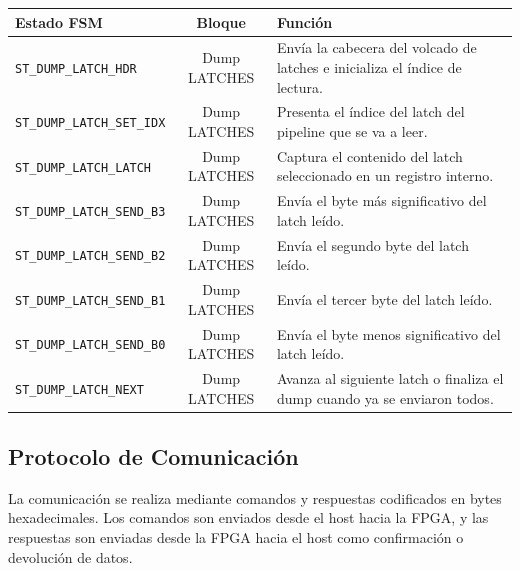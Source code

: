 \begin{center}
\begin{tabular}{|l|c|p{8.3cm}|}
\hline
\textbf{Estado FSM} & \textbf{Bloque} & \textbf{Función} \\ \hline
\texttt{ST\_DUMP\_LATCH\_HDR} & Dump LATCHES & Envía la cabecera del volcado de latches e inicializa el índice de lectura. \\ \hline
\texttt{ST\_DUMP\_LATCH\_SET\_IDX} & Dump LATCHES & Presenta el índice del latch del pipeline que se va a leer. \\ \hline
\texttt{ST\_DUMP\_LATCH\_LATCH} & Dump LATCHES & Captura el contenido del latch seleccionado en un registro interno. \\ \hline
\texttt{ST\_DUMP\_LATCH\_SEND\_B3} & Dump LATCHES & Envía el byte más significativo del latch leído. \\ \hline
\texttt{ST\_DUMP\_LATCH\_SEND\_B2} & Dump LATCHES & Envía el segundo byte del latch leído. \\ \hline
\texttt{ST\_DUMP\_LATCH\_SEND\_B1} & Dump LATCHES & Envía el tercer byte del latch leído. \\ \hline
\texttt{ST\_DUMP\_LATCH\_SEND\_B0} & Dump LATCHES & Envía el byte menos significativo del latch leído. \\ \hline
\texttt{ST\_DUMP\_LATCH\_NEXT} & Dump LATCHES & Avanza al siguiente latch o finaliza el dump cuando ya se enviaron todos. \\ \hline
\end{tabular}
\end{center}

\subsection{Protocolo de Comunicación}

La comunicación se realiza mediante comandos y respuestas codificados en bytes hexadecimales. Los comandos son enviados desde el host hacia la FPGA, y las respuestas son enviadas desde la FPGA hacia el host como confirmación o devolución de datos.

